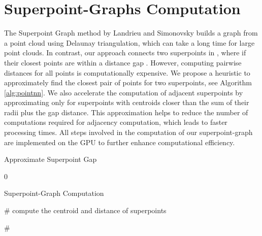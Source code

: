 \section{Superpoint-Graphs Computation}
\label{sec:graphs}

The Superpoint Graph method by Landrieu and Simonovsky \cite{landrieu2018large} builds a graph from a point cloud using Delaunay triangulation, which can take a long time for large point clouds. In contrast, our approach connects two superpoints in , where  if their closest points are within a distance gap . However, computing pairwise distances for all points is computationally expensive. We propose a heuristic to approximately find the closest pair of points for two superpoints, see Algorithm \ref{alg:pointnn}. We also accelerate the computation of adjacent superpoints by approximating only for superpoints with centroids closer than the sum of their radii plus the gap distance. This approximation helps to reduce the number of computations required for adjacency computation, which leads to faster processing times. All steps involved in the computation of our superpoint-graph are implemented on the GPU to further enhance computational efficiency.


\begin{algorithm}
\caption{Approximate Superpoint Gap}\label{alg:pointnn}
\begin{algorithmic}
    \State{ }
    \State{ }

    \For{}
        \State{}
        \State{}
    \EndFor
    
\Return{}

\end{algorithmic}
\end{algorithm}

  0

\begin{algorithm}
\caption{Superpoint-Graph Computation}\label{alg:segmentnn}
\begin{algorithmic}

    \# compute the centroid and distance of superpoints

    \State{}

    \# 
    \State{}
    
    \For{}
        \If{}
        \EndIf
    \EndFor
    
    \For{}
        \State{}
        \If{}
        \EndIf
    \EndFor


\end{algorithmic}
\end{algorithm}



